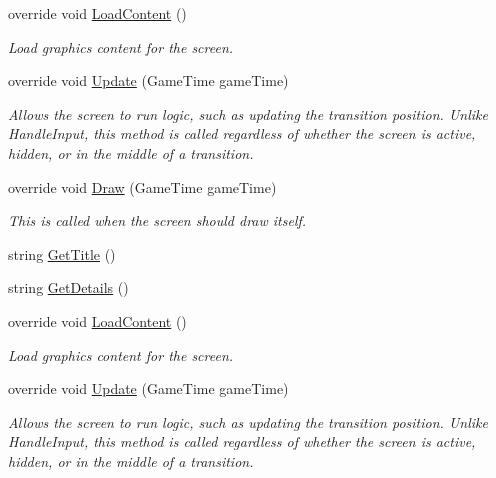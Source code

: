 \begin{DoxyCompactItemize}
\item 
override void \hyperlink{classgearit_1_1src_1_1gui_1_1_menu_options_a0a781d330c2b3022a97ac461598f6565}{Load\+Content} ()
\begin{DoxyCompactList}\small\item\em Load graphics content for the screen. \end{DoxyCompactList}\item 
override void \hyperlink{classgearit_1_1src_1_1gui_1_1_menu_options_af1cdc3976c81d502a657db91d8e54221}{Update} (Game\+Time game\+Time)
\begin{DoxyCompactList}\small\item\em Allows the screen to run logic, such as updating the transition position. Unlike Handle\+Input, this method is called regardless of whether the screen is active, hidden, or in the middle of a transition. \end{DoxyCompactList}\item 
override void \hyperlink{classgearit_1_1src_1_1gui_1_1_menu_options_ac2af62fb0c1992fc25f774bb5f2b0aa5}{Draw} (Game\+Time game\+Time)
\begin{DoxyCompactList}\small\item\em This is called when the screen should draw itself. \end{DoxyCompactList}\item 
string \hyperlink{classgearit_1_1src_1_1gui_1_1_menu_options_a5088131b575a90df2b01da4ab9775fd7}{Get\+Title} ()
\item 
string \hyperlink{classgearit_1_1src_1_1gui_1_1_menu_options_a41241aa381550bef53cf6bccc71717f5}{Get\+Details} ()
\item 
override void \hyperlink{classgearit_1_1src_1_1gui_1_1_menu_options_a0a781d330c2b3022a97ac461598f6565}{Load\+Content} ()
\begin{DoxyCompactList}\small\item\em Load graphics content for the screen. \end{DoxyCompactList}\item 
override void \hyperlink{classgearit_1_1src_1_1gui_1_1_menu_options_af1cdc3976c81d502a657db91d8e54221}{Update} (Game\+Time game\+Time)
\begin{DoxyCompactList}\small\item\em Allows the screen to run logic, such as updating the transition position. Unlike Handle\+Input, this method is called regardless of whether the screen is active, hidden, or in the middle of a transition. \end{DoxyCompactList}\item 

\end{DoxyCompactItemize}
